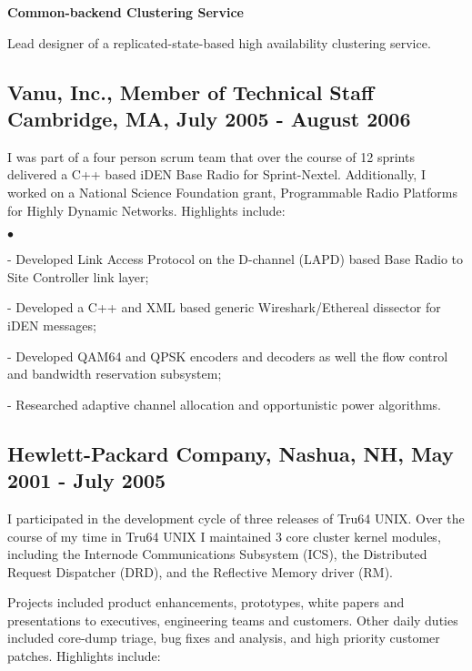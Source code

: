 \documentclass[8pt]{article}
\newenvironment{achievements}{\begin{list}{$\bullet$}{\topsep 0pt \itemsep -2pt}}{\vspace*{2pt}\end{list}}
\begin{document}
\textbf{\normalsize Common-backend Clustering Service}

Lead designer of a replicated-state-based high availability clustering service.

\subsection*{\normalsize Vanu, Inc., Member of Technical Staff \\
Cambridge, MA, July 2005 - August 2006} 

I was part of a four person scrum team that over the course of 12
sprints delivered a C++ based iDEN Base Radio for Sprint-Nextel.
Additionally, I worked on a National Science Foundation grant,
Programmable Radio Platforms for Highly Dynamic Networks.  Highlights
include:
\begin{achievements}
\item[-]Developed Link Access Protocol on the D-channel (LAPD) based
  Base Radio to Site Controller link layer;
\item[-]Developed a C++ and XML based generic Wireshark/Ethereal dissector for iDEN messages;
\item[-]Developed QAM64 and QPSK encoders and decoders as well the flow
  control and bandwidth reservation subsystem;
\item[-]Researched adaptive channel allocation and opportunistic power
  algorithms.
\end{achievements}

\subsection*{\normalsize Hewlett-Packard Company, Nashua, NH, May 2001 - July 2005} 
I participated in the development cycle of three releases of Tru64 UNIX.  Over the course of my time in Tru64 UNIX I maintained 3 core cluster kernel modules, including the Internode Communications Subsystem (ICS), the Distributed Request Dispatcher (DRD), and the Reflective Memory driver (RM).  

Projects included product enhancements, prototypes, white papers and presentations to executives, engineering teams and customers.  Other daily duties included core-dump triage, bug fixes and analysis, and high priority customer patches.  Highlights include:
\end{document}
